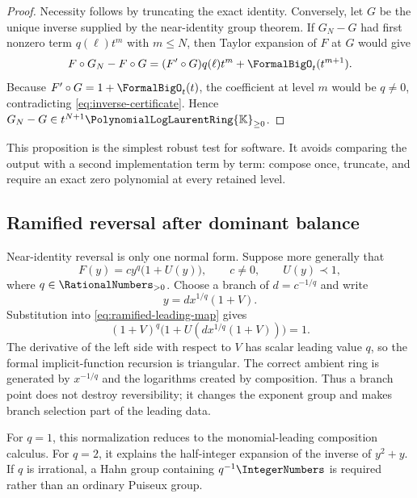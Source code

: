 \documentclass[11pt,oneside]{article}
\numberwithin{equation}{section}
\theoremstyle{definition}
\newcommand{\K}{\mathbb{K}}
\newcommand{\PL}{\PolynomialLogLaurentRing{\K}}
\begin{document}
\begin{proof}
Necessity follows by truncating the exact identity.  Conversely, let \(G\) be
the unique inverse supplied by the near-identity group theorem.  If \(G_N-G\)
had first nonzero term \(q(\ell)t^m\) with \(m\le N\), then Taylor expansion of
\(F\) at \(G\) would give
\[
  F\circ G_N-F\circ G
  =(F'\circ G)q(\ell)t^m+\FormalBigO_t(t^{m+1}).
\]
Because \(F'\circ G=1+\FormalBigO_t(t)\), the coefficient at level \(m\) would be
\(q\ne0\), contradicting \eqref{eq:inverse-certificate}.  Hence
\(G_N-G\in t^{N+1}\PL_{\ge0}\).
\end{proof}

This proposition is the simplest robust test for software.  It avoids comparing
the output with a second implementation term by term: compose once, truncate,
and require an exact zero polynomial at every retained level.

\subsection{Ramified reversal after dominant balance}

Near-identity reversal is only one normal form.  Suppose more generally that
\begin{equation}\label{eq:ramified-leading-map}
  F(y)=c y^q\bigl(1+U(y)\bigr),
  \qquad c\ne0,
  \qquad U(y)\prec1,
\end{equation}
where \(q\in\RationalNumbers_{>0}\).  Choose a branch of
\(d=c^{-1/q}\) and write
\begin{equation}\label{eq:ramified-inverse-ansatz}
  y=d x^{1/q}(1+V).
\end{equation}
Substitution into \eqref{eq:ramified-leading-map} gives
\begin{equation}\label{eq:ramified-normalized-equation}
  (1+V)^q
  \bigl(1+U(d x^{1/q}(1+V))\bigr)=1.
\end{equation}
The derivative of the left side with respect to \(V\) has scalar leading value
\(q\), so the formal implicit-function recursion is triangular.  The correct
ambient ring is generated by \(x^{-1/q}\) and the logarithms created by
composition.  Thus a branch point does not destroy reversibility; it changes
the exponent group and makes branch selection part of the leading data.

For \(q=1\), this normalization reduces to the monomial-leading composition
calculus.  For \(q=2\), it explains the half-integer expansion of the inverse of
\(y^2+y\).  If \(q\) is irrational, a Hahn group containing \(q^{-1}\IntegerNumbers\) is
required rather than an ordinary Puiseux group.
\end{document}
